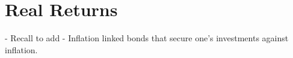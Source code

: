 \chapter{Real Returns}

- Recall to add - Inflation linked bonds that secure one's investments against inflation.